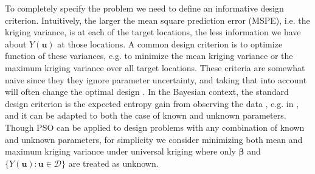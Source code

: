 \documentclass[12pt]{article}
\begin{document}
To completely specify the problem we need to define an informative design criterion. Intuitively, the larger the mean square prediction error (MSPE), i.e. the kriging variance, is at each of the target locations, the less information we have about $Y(\bm{u})$ at those locations. A common design criterion is to optimize function of these variances, e.g. to minimize the mean kriging variance or the maximum kriging variance over all target locations. These criteria are somewhat naive since they they ignore parameter uncertainty, and taking that into account will often change the optimal design \citep{zimmerman2006optimal}. In the Bayesian context, the standard design criterion is the expected entropy gain from observing the data \citep{ebrahimi2010information}, e.g. in \cite{fuentes2007bayesian}, and it can be adapted to both the case of known and unknown parameters. Though PSO can be applied to design problems with any combination of known and unknown parameters, for simplicity we consider minimizing both mean and maximum kriging variance under universal kriging where only $\bm{\beta}$ and $\{Y(\bm{u}):\bm{u}\in\mathcal{D}\}$ are treated as unknown.
\end{document}
